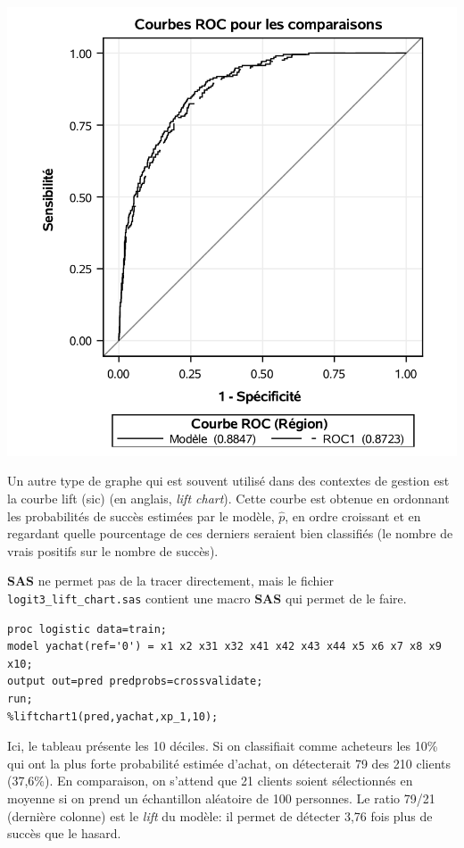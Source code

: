 \documentclass[
  11pt,
  letterpaper,
]{book}
\theoremstyle{definition}
\theoremstyle{definition}
\theoremstyle{definition}
\theoremstyle{remark}
\begin{document}
\begin{center}\includegraphics[width=0.8\linewidth]{figures/03-logistic-e15} \end{center}

Un autre type de graphe qui est souvent utilisé dans des contextes de gestion
est la courbe lift (sic) (en anglais, \emph{lift chart}). Cette courbe est obtenue en ordonnant les probabilités de succès estimées par le modèle, \(\widehat{p}\), en ordre croissant et en regardant quelle pourcentage de ces derniers seraient bien classifiés (le nombre de vrais positifs sur le nombre de succès).

\textbf{SAS} ne permet pas de la tracer directement, mais le fichier \texttt{logit3\_lift\_chart.sas} contient une macro \textbf{SAS} qui permet de le faire.

\begin{verbatim}
proc logistic data=train;
model yachat(ref='0') = x1 x2 x31 x32 x41 x42 x43 x44 x5 x6 x7 x8 x9 x10; 
output out=pred predprobs=crossvalidate;
run;
%liftchart1(pred,yachat,xp_1,10);
\end{verbatim}

Ici, le tableau présente les 10 déciles. Si on classifiait comme acheteurs les 10\% qui ont la plus forte probabilité estimée d'achat, on détecterait 79 des 210 clients (37,6\%). En comparaison, on s'attend que 21 clients soient sélectionnés en moyenne si on prend un échantillon aléatoire de 100 personnes. Le ratio 79/21 (dernière colonne) est le \emph{lift} du modèle: il permet de détecter 3,76 fois plus de succès que le hasard.
\end{document}
